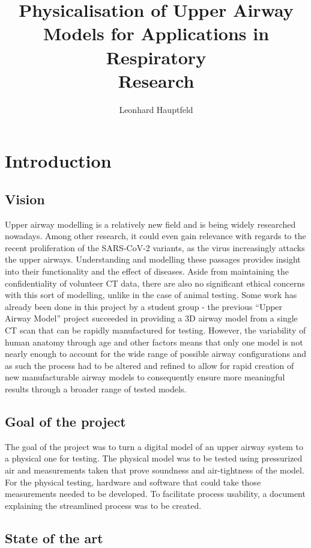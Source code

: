 \documentclass[MME,Projekt,english]{twbook}%
\title{Physicalisation of Upper Airway \\Models for Applications in Respiratory \\Research}
\author{Leonhard Hauptfeld}
\begin{document}
\maketitle

\chapter{Introduction}

\section{Vision}

Upper airway modelling is a relatively new field and is being widely researched nowadays. Among other research, it could even gain relevance with regards to the recent proliferation of the SARS-CoV-2 variants, as the virus increasingly attacks the upper airways\cite{omicronairways}. Understanding and modelling these passages provides insight into their functionality and the effect of diseases. Aside from maintaining the confidentiality of volunteer CT data, there are also no significant ethical concerns with this sort of modelling, unlike in the case of animal testing. Some work has already been done in this project by a student group - the previous “Upper Airway Model” project succeeded in providing a 3D airway model from a single CT scan that can be rapidly manufactured for testing. However, the variability of human anatomy through age and other factors means that only one model is not nearly enough to account for the wide range of possible airway configurations and as such the process had to be altered and refined to allow for rapid creation of new manufacturable airway models to consequently ensure more meaningful results through a broader range of tested models.

\section{Goal of the project}

The goal of the project was to turn a digital model of an upper airway system to a physical one for testing.
The physical model was to be tested using pressurized air and measurements taken that prove soundness and air-tightness of the model.
For the physical testing, hardware and software that could take those measurements needed to be developed.
To facilitate process usability, a document explaining the streamlined process was to be created.
\section{State of the art}
\end{document}
